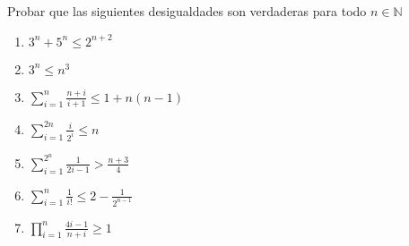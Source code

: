 \ejercicio
Probar que las siguientes desigualdades son verdaderas para todo $n \in \mathbb{N}$
\begin{multicols}{2}
    \begin{enumerate}[label=\roman*)]
        \item $3^n + 5^n \leq 2^{n+2}$ 
        \item $3^n \leq n^3$ 
        \item $\displaystyle \sum_{i=1}^{n} \frac{n+i}{i+1} \leq 1 + n(n-1)$ 
        \item $\displaystyle \sum_{i=1}^{2n} \frac{i}{2^i} \leq n$
        \item $\displaystyle \sum_{i=1}^{2^n} \frac{1}{2i-1} > \frac{n+3}{4}$
        \item $\displaystyle \sum_{i=1}^{n} \frac{1}{i!} \leq 2 - \frac{1}{2^{n-1}}$
        \item $\displaystyle \prod_{i=1}^{n} \frac{4i-1}{n+i} \geq 1$
    \end{enumerate}
\end{multicols}

